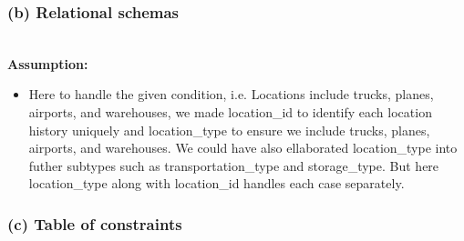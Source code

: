 \documentclass[12pt]{article}
\begin{document}
\newpage

\subsubsection*{(b) Relational schemas}

\vspace{2cm} \\
\textbf{Assumption:}
\begin{itemize}
    \item Here to handle the given condition, i.e. Locations include trucks, planes, airports, and warehouses, we made location\_id to identify each location history uniquely and location\_type to ensure we include trucks, planes, airports, and warehouses. We could have also ellaborated location\_type into futher subtypes such as transportation\_type and storage\_type. But here location\_type along with location\_id handles each case separately.
\end{itemize}

\newpage

\subsubsection*{(c) Table of constraints}
\end{document}
